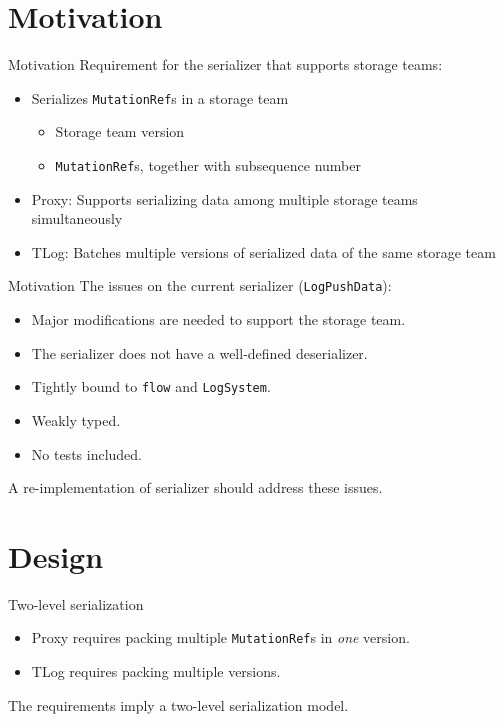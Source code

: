 \documentclass[9pt]{beamer}
\begin{document}
    \section{Motivation}

    \begin{frame}{Motivation}
        Requirement for the serializer that supports storage teams:
        \begin{itemize}
            \item Serializes \texttt{MutationRef}s in a storage team
            \begin{itemize}
                \item Storage team version
                \item \texttt{MutationRef}s, together with subsequence number
            \end{itemize}
            \item Proxy: Supports serializing data among multiple storage teams simultaneously
            \item TLog: Batches multiple versions of serialized data of the same storage team
        \end{itemize}
    \end{frame}    

    \begin{frame}{Motivation}
        The issues on the current serializer (\texttt{LogPushData}):
        \begin{itemize}
            \item Major modifications are needed to support the storage team.
            \item {\color{gray}The serializer does not have a well-defined deserializer.}
            \item {\color{gray}Tightly bound to \texttt{flow} and \texttt{LogSystem}.}
            \item {\color{gray}Weakly typed.}
            \item {\color{gray}No tests included.}
        \end{itemize}
        A re-implementation of serializer should address these issues.
    \end{frame}

    \section{Design}

    \begin{frame}{Two-level serialization}
        \begin{itemize}
            \item Proxy requires packing multiple \texttt{MutationRef}s in \emph{one} version.
            \item TLog requires packing multiple versions.
        \end{itemize}

        The requirements imply a two-level serialization model.
    \end{frame}
\end{document}
